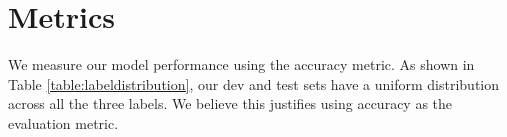 \section{Metrics}
\label{sec:metrics}


We measure our model performance using the accuracy metric. As shown in Table \ref{table:labeldistribution}, our dev and test sets have a uniform distribution across all the three labels. We believe this justifies using accuracy as the evaluation metric.

